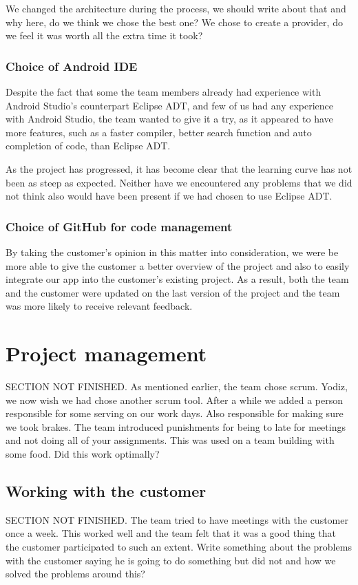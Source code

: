We changed the architecture during the process, we should write about that and why here, do we think we chose the best one? We chose to create a provider, do we feel it was worth all the extra time it took? 

\subsubsection{Choice of Android IDE}
Despite the fact that some the team members already had experience with Android Studio's counterpart Eclipse ADT, and few of us had any experience with Android Studio, the team wanted to give it a try, as it appeared to have more features, such as a faster compiler, better search function and auto completion of code, than Eclipse ADT. 

As the project has progressed, it has become clear that the learning curve has not been as steep as expected. Neither have we encountered any problems that we did not think also would have been present if we had chosen to use Eclipse ADT.

\subsubsection{Choice of GitHub for code management}
By taking the customer's opinion in this matter into consideration, we were be more able to give the customer a better overview of the project and also to easily integrate our app into the customer's existing project. As a result, both the team and the customer were updated on the last version of the project and the team was more likely to receive relevant feedback. 

\section{Project management}
SECTION NOT FINISHED. As mentioned earlier, the team chose scrum. Yodiz, we now wish we had chose another scrum tool. After a while we added a person responsible for some serving on our work days. Also responsible for making sure we took brakes. 
The team introduced punishments for being to late for meetings and not doing all of your assignments. This was used on a team building with some food. Did this work optimally?
\subsection{Working with the customer}
SECTION NOT FINISHED. The team tried to have meetings with the customer once a week. This worked well and the team felt that it was a good thing that the customer participated to such an extent. Write something about the problems with the customer saying he is going to do something but did not and how we solved the problems around this?

